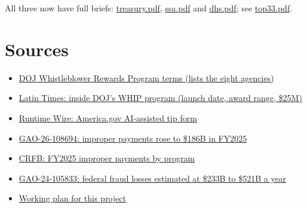\documentclass[letterpaper,11pt]{article}
\providecommand{\tightlist}{\setlength{\itemsep}{0pt}\setlength{\parskip}{0pt}}
\begin{document}
All three now have full briefs: \url{treasury.pdf}, \url{ssa.pdf} and
\url{dhs.pdf}; see \url{top33.pdf}.

\hypertarget{sources}{%
\section{Sources}\label{sources}}

\begin{itemize}
\tightlist
\item
  \href{https://www.justice.gov/fraud/whistleblower}{DOJ Whistleblower
  Rewards Program terms (lists the eight agencies)}
\item
  \href{https://www.latintimes.com/how-turn-fraudster-get-paid-immediately-inside-dojs-groundbreaking-whip-program-600382}{Latin
  Times: inside DOJ's WHIP program (launch date, award range, \$25M)}
\item
  \href{https://runtimewire.com/article/america-gov-fraud-whistleblower-ai-intake}{Runtime
  Wire: America.gov AI-assisted tip form}
\item
  \href{https://www.gao.gov/products/gao-26-108694}{GAO-26-108694:
  improper payments rose to \$186B in FY2025}
\item
  \href{https://www.crfb.org/blogs/federal-improper-payments-total-186-billion-fy-2025}{CRFB:
  FY2025 improper payments by program}
\item
  \href{https://www.gao.gov/products/GAO-24-105833}{GAO-24-105833:
  federal fraud losses estimated at \$233B to \$521B a year}
\item
  \href{../plan.pdf}{Working plan for this project}
\end{itemize}
\end{document}
